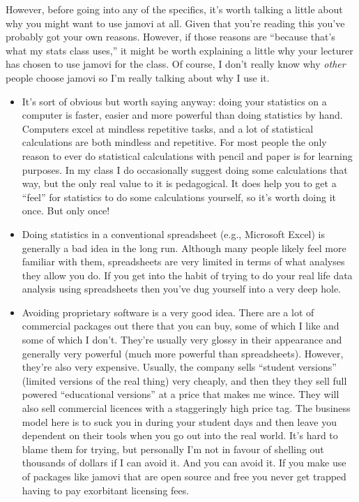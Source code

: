 \documentclass[
]{book}
\providecommand{\tightlist}{%
  \setlength{\itemsep}{0pt}\setlength{\parskip}{0pt}}
\begin{document}
However, before going into any of the specifics, it's worth talking a little about why you might want to use jamovi at all. Given that you're reading this you've probably got your own reasons. However, if those reasons are ``because that's what my stats class uses,'' it might be worth explaining a little why your lecturer has chosen to use jamovi for the class. Of course, I don't really know why \emph{other} people choose jamovi so I'm really talking about why I use it.

\begin{itemize}
\tightlist
\item
  It's sort of obvious but worth saying anyway: doing your statistics on a computer is faster, easier and more powerful than doing statistics by hand. Computers excel at mindless repetitive tasks, and a lot of statistical calculations are both mindless and repetitive. For most people the only reason to ever do statistical calculations with pencil and paper is for learning purposes. In my class I do occasionally suggest doing some calculations that way, but the only real value to it is pedagogical. It does help you to get a ``feel'' for statistics to do some calculations yourself, so it's worth doing it once. But only once!
\item
  Doing statistics in a conventional spreadsheet (e.g., Microsoft Excel) is generally a bad idea in the long run. Although many people likely feel more familiar with them, spreadsheets are very limited in terms of what analyses they allow you do. If you get into the habit of trying to do your real life data analysis using spreadsheets then you've dug yourself into a very deep hole.
\item
  Avoiding proprietary software is a very good idea. There are a lot of commercial packages out there that you can buy, some of which I like and some of which I don't. They're usually very glossy in their appearance and generally very powerful (much more powerful than spreadsheets). However, they're also very expensive. Usually, the company sells ``student versions'' (limited versions of the real thing) very cheaply, and then they they sell full powered ``educational versions'' at a price that makes me wince. They will also sell commercial licences with a staggeringly high price tag. The business model here is to suck you in during your student days and then leave you dependent on their tools when you go out into the real world. It's hard to blame them for trying, but personally I'm not in favour of shelling out thousands of dollars if I can avoid it. And you can avoid it. If you make use of packages like jamovi that are open source and free you never get trapped having to pay exorbitant licensing fees.

\end{itemize}
\end{document}
